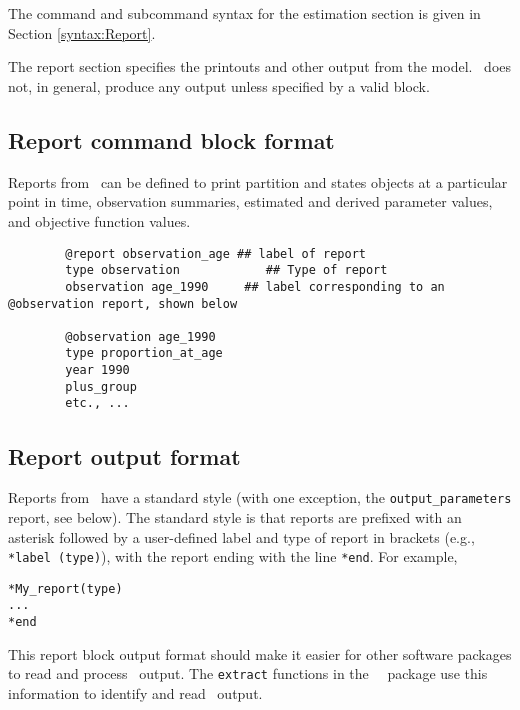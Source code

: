 \section{\label{sec:Report}}

The command and subcommand syntax for the estimation section is given in Section \ref{syntax:Report}.

The report section specifies the printouts and other output from the model. \CNAME\ does not, in general, produce any output unless specified by a valid  block.

\subsection{Report command block format}

Reports from \CNAME\ can be defined to print partition and states objects at a particular point in time, observation summaries, estimated and derived parameter values, and objective function values.

\begin{verbatim}
		@report observation_age ## label of report
		type observation		    ## Type of report
		observation age_1990	 ## label corresponding to an @observation report, shown below

		@observation age_1990
		type proportion_at_age
		year 1990
		plus_group
		etc., ...
\end{verbatim}

\subsection{Report output format}

Reports from \CNAME\ have a standard style (with one exception, the \texttt{output\_parameters} report, see below). The standard style is that reports are prefixed with an asterisk followed by a user-defined label and type of report in brackets (e.g., \texttt{*label (type)}), with the report ending with the line \texttt{*end}. For example,

\begin{verbatim}
*My_report(type)
...
*end
\end{verbatim}

This report block output format should make it easier for other software packages to read and process \CNAME\ output. The \texttt{extract} functions in the \R\ \CNAME\ package use this information to identify and read \CNAME\ output.

